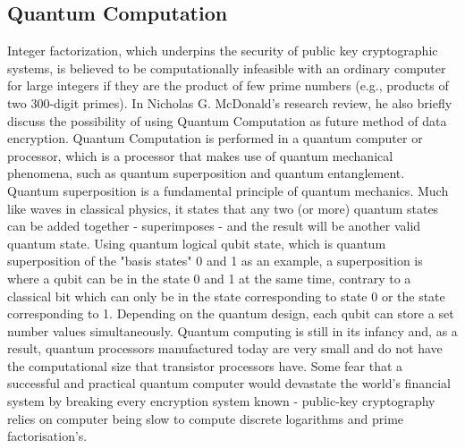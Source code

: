 \documentclass[journal]{IEEEtran}
\begin{document}
\subsection{\textbf{Quantum Computation}}
Integer factorization, which underpins the security of public key cryptographic systems, is believed to be computationally infeasible with an ordinary computer for large integers if they are the product of few prime numbers (e.g., products of two 300-digit primes). In Nicholas G. McDonald's research review, he also briefly discuss the possibility of using Quantum Computation as future method of data encryption. Quantum Computation is performed in a quantum computer or processor, which is a processor that makes use of quantum mechanical phenomena, such as quantum superposition and quantum entanglement. Quantum superposition is a fundamental principle of quantum mechanics. Much like waves in classical physics, it states that any two (or more) quantum states can be added together - superimposes - and the result will be another valid quantum state. Using quantum logical qubit state, which is quantum superposition of the "basis states" 0 and 1 as an example, a superposition is where a qubit can be in the state 0 and 1 at the same time, contrary to a classical bit which can only be in the state corresponding to state 0 or the state corresponding to 1. Depending on the quantum design, each qubit can store a set number values simultaneously. Quantum computing is still in its infancy and, as a result, quantum processors manufactured today are very small and do not have the computational size that transistor processors have. Some fear that a successful and practical quantum computer would devastate the world's financial system by breaking every encryption system known - public-key cryptography relies on computer being slow to compute discrete logarithms and prime factorisation's.
\end{document}
